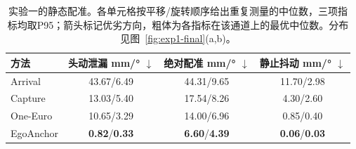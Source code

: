 \begin{table}[t]
\centering
\caption{实验一的静态配准。各单元格按平移/旋转顺序给出重复测量的中位数，三项指标均取P95；箭头标记优劣方向，粗体为各指标在该通道上的最优中位数。分布见图~\ref{fig:exp1-final}(a,b)。}
\label{tab:exp1-static}
\setlength{\tabcolsep}{3.0pt}
\renewcommand{\arraystretch}{1.10}
\begin{tabular}{@{}lccc@{}}
\toprule
方法 &
\shortstack{头动泄漏\\mm/° $\downarrow$} &
\shortstack{绝对配准\\mm/° $\downarrow$} &
\shortstack{静止抖动\\mm/° $\downarrow$} \\
\midrule
Arrival   & 43.67/6.49 & 44.31/9.65 & 11.70/2.98 \\
Capture   & 13.03/5.40 & 17.54/8.26 & 4.30/2.60 \\
One-Euro  & 10.65/3.29 & 14.00/6.96 & 0.85/0.40 \\
EgoAnchor & \textbf{0.82}/\textbf{0.33} & \textbf{6.60}/\textbf{4.39} & \textbf{0.06}/\textbf{0.03} \\
\bottomrule
\end{tabular}
\end{table}
